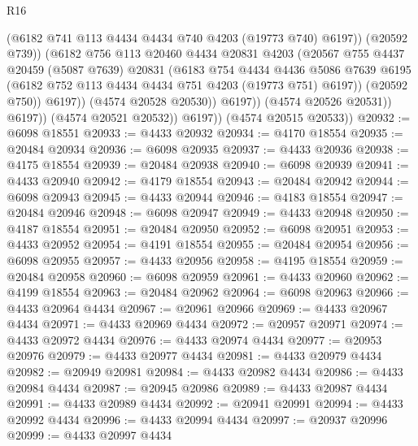 \begin{lexlean}{R16}
\begin{coremodule}
                              (@6182 @741 @113 @4434 @4434 @740 @4203 (@19773 @740) @6197))
                            (@20592 @739))
                          (@6182
                            @756
                            @113
                            @20460
                            @4434
                            @20831
                            @4203
                            (@20567
                              @755
                              @4437
                              @20459
                              (@5087 @7639)
                              @20831
                              (@6183
                                @754
                                @4434
                                @4436
                                @5086
                                @7639
                                @6195
                                (@6182 @752 @113 @4434 @4434 @751 @4203 (@19773 @751) @6197))
                              (@20592 @750))
                            @6197))
                        (@4574 @20528 @20530))
                      @6197))
                  (@4574 @20526 @20531))
                @6197))
            (@4574 @20521 @20532))
          @6197))
      (@4574 @20515 @20533))
@20932 := @6098 @18551
@20933 := @4433 @20932
@20934 := @4170 @18554
@20935 := @20484 @20934
@20936 := @6098 @20935
@20937 := @4433 @20936
@20938 := @4175 @18554
@20939 := @20484 @20938
@20940 := @6098 @20939
@20941 := @4433 @20940
@20942 := @4179 @18554
@20943 := @20484 @20942
@20944 := @6098 @20943
@20945 := @4433 @20944
@20946 := @4183 @18554
@20947 := @20484 @20946
@20948 := @6098 @20947
@20949 := @4433 @20948
@20950 := @4187 @18554
@20951 := @20484 @20950
@20952 := @6098 @20951
@20953 := @4433 @20952
@20954 := @4191 @18554
@20955 := @20484 @20954
@20956 := @6098 @20955
@20957 := @4433 @20956
@20958 := @4195 @18554
@20959 := @20484 @20958
@20960 := @6098 @20959
@20961 := @4433 @20960
@20962 := @4199 @18554
@20963 := @20484 @20962
@20964 := @6098 @20963
@20966 := @4433 @20964 @4434
@20967 := @20961 @20966
@20969 := @4433 @20967 @4434
@20971 := @4433 @20969 @4434
@20972 := @20957 @20971
@20974 := @4433 @20972 @4434
@20976 := @4433 @20974 @4434
@20977 := @20953 @20976
@20979 := @4433 @20977 @4434
@20981 := @4433 @20979 @4434
@20982 := @20949 @20981
@20984 := @4433 @20982 @4434
@20986 := @4433 @20984 @4434
@20987 := @20945 @20986
@20989 := @4433 @20987 @4434
@20991 := @4433 @20989 @4434
@20992 := @20941 @20991
@20994 := @4433 @20992 @4434
@20996 := @4433 @20994 @4434
@20997 := @20937 @20996
@20999 := @4433 @20997 @4434

\end{coremodule}
\end{lexlean}
